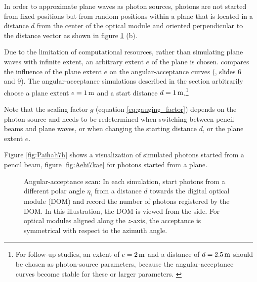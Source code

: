 In order to approximate plane waves as photon sources, photons are not
started from fixed positions but from random positions within a plane
that is located in a distance \(d\) from the center of the optical
module and oriented perpendicular to the distance vector as shown in
figure \ref{fig:quie8Oof} (b).

Due to the limitation of computational resources, rather than simulating
plane waves with infinite extent, an arbitrary extent \(e\) of the plane
is chosen. \rongen \cite{martindardupdate,rongenswedishcamera} compares
the influence of the plane extent \(e\) on the angular-acceptance curves
(\cite{martindardupdate}, slides 6 and 9). The angular-acceptance
simulations described in the section arbitrarily choose a plane extent
\(e = 1\text{\,m}\) and a start distance
\(d = 1\text{\,m}\).\footnote{For follow-up studies, an extent of $e=2\text{\,m}$ and a distance of $d=2.5\text{\,m}$ should be chosen as photon-source parameters, because the angular-acceptance curves become stable for these or larger parameters. \cite{rongenswedishcamera}}

Note that the scaling factor \(g\) (equation \ref{eq:gauging_factor})
depends on the photon source and needs to be redetermined when switching
between pencil beams and plane waves, or when changing the starting
distance \(d\), or the plane extent \(e\).

Figure \ref{fig:Paihah7h} shows a \steamshovel visualization of
simulated photons started from a pencil beam, figure \ref{fig:Aehi7kae}
for photons started from a plane.

\begin{figure}[htbp]
  \hfill
  \caption{Angular-acceptance scan: In each simulation, start photons from a different polar angle $\eta_i$ from a distance $d$ towards the digital optical module (DOM) and record the number of photons registered by the DOM. In this illustration, the DOM is viewed from the side. For optical modules aligned along the $z$-axis, the acceptance is symmetrical with respect to the azimuth angle.}
  \label{fig:quie8Oof}
\end{figure}

